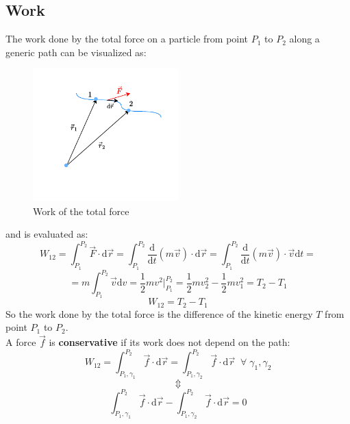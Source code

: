 \subsection{Work}
The work done by the total force on a particle from point $P_1$ to $P_2$ along a generic path can be visualized as:
\begin{figure}[H]
    \centering
    \includegraphics[width=0.5\textwidth]{res/svg/work.drawio}
    \caption{Work of the total force}
    \label{fig:image4}
\end{figure}
and is evaluated as:
\begin{equation}
    W_{12} = \int_{P_1}^{P_2}\vec{F}\cdot\mathrm{d}\vec{r} = \int_{P_1}^{P_2}\dfrac{\mathrm{d}}{\mathrm{d}t}(m\vec{v})\cdot\mathrm{d}\vec{r} = \int_{P_1}^{P_2}\dfrac{\mathrm{d}}{\mathrm{d}t}(m\vec{v})\cdot\vec{v}\mathrm{d}t =
\end{equation}
\begin{equation}
    = m\int_{P_1}^{P_2}\vec{v}\mathrm{d}v = \dfrac{1}{2}mv^2\bigg|_{P_1}^{P_2} = \dfrac{1}{2}mv_2^2 - \dfrac{1}{2}mv_1^2 = T_2 -T_1
\end{equation}
\begin{equation} \label{e:total_work}
    W_{12} = T_2 -T_1
\end{equation}
So the work done by the total force is the difference of the kinetic energy $T$ from point $P_1$ to $P_2$.\\
A force $\vec{f}$ is \textbf{conservative} if its work does not depend on the path:
\begin{equation}
    W_{12} = \int_{P_1,\gamma_1}^{P_2}\vec{f}\cdot\mathrm{d}\vec{r} = \int_{P_1,\gamma_2}^{P_2}\vec{f}\cdot\mathrm{d}\vec{r}\;\;\forall\;\gamma_1, \gamma_2
\end{equation}
\[\Updownarrow \]
\begin{equation}
    \int_{P_1,\gamma_1}^{P_2}\vec{f}\cdot\mathrm{d}\vec{r} - \int_{P_1,\gamma_2}^{P_2}\vec{f}\cdot\mathrm{d}\vec{r} = 0
\end{equation}
